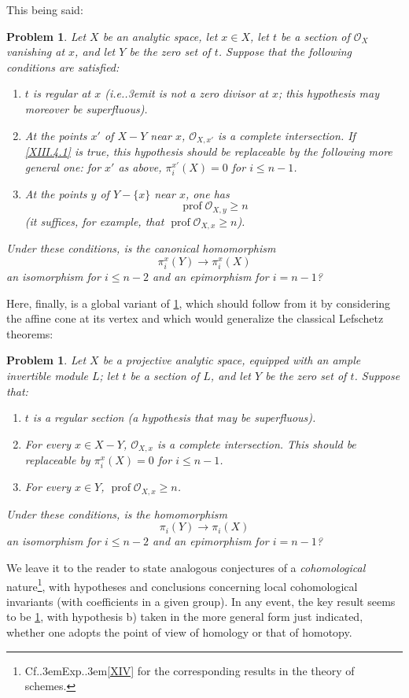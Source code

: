 \documentclass[11pt,a4paper,oneside]{book}
\providecommand{\sisi}[2]{#2}
\providecommand{\pageoriginale}{%
  \refstepcounter{pageoriginal}%
  \marginpar{\raggedright\footnotesize\bfseries\thepageoriginal}%
  \xspace}
\providecommand{\sfootnote}[1]{\footnote{#1}}
\providecommand{\Cf}{Cf.\kern.3em}
\providecommand{\ie}{i.e.\kern.3em}
\providecommand{\Exp}{Exp.\kern.3em}
\providecommand{\Oo}{\mathcal O}
\providecommand{\OX}{\mathcal O_X}
\providecommand{\prof}{\operatorname{prof}}
\newenvironment{enumeratea}
  {\begin{enumerate}[label=\alph*)]}
  {\end{enumerate}}
\theoremstyle{plain}
\newtheorem{probleme}[subsection]{Problem}
\theoremstyle{definition}
\theoremstyle{remark}
\renewcommand{\Ref}[1]{\textup{\ref{#1}}}
\begin{document}
This being said:

\begin{probleme} \label{XIII.4.2}
Let $X$ be an analytic space, let $x\in X$, let $t$ be a section of
$\OX$ vanishing at $x$, and let $Y$ be the zero set of $t$. Suppose that
the following conditions are satisfied:
\begin{enumeratea}
\item
$t$ is regular at $x$ (\ie it is not a zero divisor at $x$; this
hypothesis may moreover be superfluous).
\item
At the points $x'$ of $X-Y$ near $x$, $\Oo_{X,x'}$ is a complete
intersection. If \Ref{XIII.4.1} is true, this hypothesis should be
replaceable by the following more general one: for $x'$ as above,
$\pi_i^{x'}(X)=0$ for $i\leq n-1$.
\item
At the points $y$ of $Y-\{x\}$ near $x$, one has
$$
\prof\Oo_{X,y}\geq n
$$
(it suffices, for example, that $\prof\Oo_{X,x}\geq n$).
\end{enumeratea}

Under these conditions, is the canonical homomorphism
$$
\pi_i^x(Y)\to\pi_i^x(X)
$$
an isomorphism for $i\leq n-2$ and an epimorphism for $i=n-1$?
\end{probleme}

Here, finally, is a global variant of \Ref{XIII.4.2}, which should
follow from it by considering the affine cone at its vertex and
which would generalize the classical Lefschetz theorems:

\begin{probleme} \label{XIII.4.3}
Let\pageoriginale $X$ be a projective analytic space, equipped with an
ample invertible module $L$; let $t$ be a section of $L$, and let $Y$ be
the zero set of $t$. Suppose that:
\begin{enumeratea}
\item
$t$ is a regular section (\sisi{\ignorespaces}{a hypothesis} that may
be superfluous).
\item
For every $x\in X-Y$, $\Oo_{X,x}$ is a complete intersection. This
should be replaceable by $\pi_i^x(X)=0$ for $i\leq n-1$.
\item
For every $x\in Y$, $\prof\Oo_{X,x}\geq n$.
\end{enumeratea}

Under these conditions, is the homomorphism
$$
\pi_i(Y)\to\pi_i(X)
$$
an isomorphism for $i\leq n-2$ and an epimorphism for $i=n-1$?
\end{probleme}

We leave it to the reader to state analogous conjectures of a
\emph{cohomological} nature\sfootnote{\Cf \Exp \Ref{XIV} for the
corresponding results in the theory of schemes.}, with hypotheses and
conclusions concerning local cohomological invariants (with coefficients
in a given group). In any event, the key result seems to be
\Ref{XIII.4.2}, with hypothesis b) taken in the more general form just
indicated, whether one adopts the point of view of homology or that of
homotopy.
\end{document}
